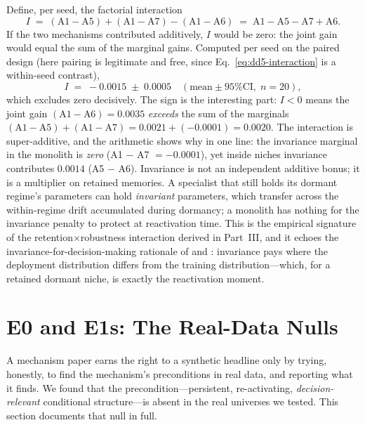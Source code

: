 Define, per seed, the factorial interaction
\begin{equation}
I \;=\; (\text{A1} - \text{A5}) + (\text{A1} - \text{A7})
- (\text{A1} - \text{A6})
\;=\; \text{A1} - \text{A5} - \text{A7} + \text{A6}.
\label{eq:dd5-interaction}
\end{equation}
If the two mechanisms contributed additively, $I$ would be zero: the joint
gain would equal the sum of the marginal gains. Computed per seed on the
paired design (here pairing is legitimate and free, since
Eq.~\eqref{eq:dd5-interaction} is a within-seed contrast),
\[
I \;=\; -0.0015 \;\pm\; 0.0005 \quad (\text{mean} \pm \text{95\% CI},\;
n = 20),
\]
which excludes zero decisively. The sign is the interesting part: $I < 0$
means the joint gain $(\text{A1}-\text{A6}) = 0.0035$ \emph{exceeds} the sum
of the marginals $(\text{A1}-\text{A5}) + (\text{A1}-\text{A7}) =
0.0021 + (-0.0001) = 0.0020$. The interaction is super-additive, and the
arithmetic shows why in one line: the invariance marginal in the monolith is
\emph{zero} (A1 $-$ A7 $= -0.0001$), yet inside niches invariance
contributes $0.0014$ (A5 $-$ A6). Invariance is not an independent additive
bonus; it is a multiplier on retained memories. A specialist that still
holds its dormant regime's parameters can hold \emph{invariant} parameters,
which transfer across the within-regime drift accumulated during dormancy;
a monolith has nothing for the invariance penalty to protect at
reactivation time. This is the empirical signature of the
retention$\times$robustness interaction derived in
Part~III, and it echoes the
invariance-for-decision-making rationale of \citet{krueger2021rex} and
\citet{yan2026invpnco}: invariance pays where the deployment distribution
differs from the training distribution---which, for a retained dormant
niche, is exactly the reactivation moment.

\section{E0 and E1s: The Real-Data Nulls}
\label{sec:dd5-e0e1s}

A mechanism paper earns the right to a synthetic headline only by trying,
honestly, to find the mechanism's preconditions in real data, and reporting
what it finds. We found that the precondition---persistent, re-activating,
\emph{decision-relevant} conditional structure---is absent in the real
universes we tested. This section documents that null in full.

